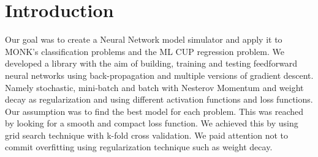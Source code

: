 \section{Introduction}
Our goal was to create a Neural Network model simulator and apply it to MONK's classification problems and the ML CUP regression problem. 
We developed a library with the aim of building, training and testing feedforward neural networks using back-propagation and multiple versions of gradient descent. Namely stochastic, mini-batch and batch with Nesterov Momentum and weight decay as regularization and using different activation functions and loss functions. 
Our assumption was to find the best model for each problem. This was reached by looking for a smooth and compact loss function. We achieved this by using grid search technique with k-fold cross validation. We paid attention not to commit overfitting using regularization technique such as weight decay. 